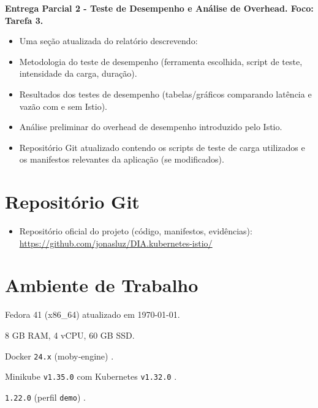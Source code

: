 \documentclass[9pt,a4paper,twocolumn,twoside]{tau-class/tau}
\begin{document}
\textbf{Entrega Parcial 2 - Teste de Desempenho e Análise de Overhead. Foco: Tarefa 3.} 
    \begin{itemize}
        \item Uma seção atualizada do relatório descrevendo:
        \item Metodologia do teste de desempenho (ferramenta escolhida, script de teste, intensidade da carga, duração).
        \item Resultados dos testes de desempenho (tabelas/gráficos comparando latência e vazão com e sem Istio).
        \item Análise preliminar do overhead de desempenho introduzido pelo Istio.
        \item Repositório Git atualizado contendo os scripts de teste de carga utilizados e os manifestos relevantes da aplicação (se modificados).
    \end{itemize}
        

\section{Repositório Git}
\begin{itemize}[leftmargin=*]
  \item Repositório oficial do projeto (código, manifestos, evidências):\\
  \url{https://github.com/jonasluz/DIA.kubernetes-istio/}
\end{itemize}


\section{Ambiente de Trabalho}
\begin{description}[leftmargin=1.5cm]
  \item[Sistema] Fedora 41 (x86\_64) atualizado em \today.
  \item[Recursos] 8 GB RAM, 4 vCPU, 60 GB SSD.
  \item[Container Runtime] Docker \texttt{24.x} (moby‑engine) \cite{docker}.
  \item[Cluster] Minikube \texttt{v1.35.0} com Kubernetes \texttt{v1.32.0} \cite{minikube}.
  \item[Istio] \texttt{1.22.0} (perfil \texttt{demo}) \cite{istio}.
\end{description}
\end{document}

